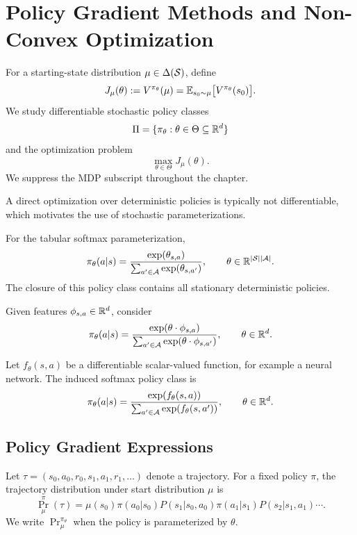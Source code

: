 \chapter{Policy Gradient Methods and Non-Convex Optimization}

For a starting-state distribution $\mu \in \Delta(\mathcal{S})$, define
\[
J_\mu(\theta) := V^{\pi_\theta}(\mu)
= \mathbb{E}_{s_0\sim \mu}\big[V^{\pi_\theta}(s_0)\big].
\]
We study differentiable stochastic policy classes
\[
\Pi=\{\pi_\theta:\theta\in\Theta\subseteq \mathbb{R}^d\}
\]
and the optimization problem
\[
\max_{\theta\in\Theta} J_\mu(\theta).
\]
We suppress the MDP subscript throughout the chapter.

A direct optimization over deterministic policies is typically not differentiable, which
motivates the use of stochastic parameterizations.

\begin{example} \label{ex:softmax}
For the tabular softmax parameterization,
\begin{equation}\label{eq:softmax}
\pi_\theta(a|s)
=
\frac{\exp(\theta_{s,a})}{\sum_{a'\in\mathcal{A}}\exp(\theta_{s,a'})},
\qquad
\theta\in \mathbb{R}^{|\mathcal{S}||\mathcal{A}|}.
\end{equation}
The closure of this policy class contains all stationary deterministic policies.
\end{example}

\begin{example} \label{ex:linear_policy}
Given features $\phi_{s,a}\in\mathbb{R}^d$, consider
\[
\pi_\theta(a|s)
=
\frac{\exp(\theta\cdot \phi_{s,a})}
{\sum_{a'\in\mathcal{A}}\exp(\theta\cdot \phi_{s,a'})},
\qquad
\theta\in\mathbb{R}^d.
\]
\end{example}

\begin{example} \label{ex:neural_policy}
Let $f_\theta(s,a)$ be a differentiable scalar-valued function, for example a neural network.
The induced softmax policy class is
\[
\pi_\theta(a|s)
=
\frac{\exp(f_\theta(s,a))}
{\sum_{a'\in\mathcal{A}}\exp(f_\theta(s,a'))},
\qquad
\theta\in\mathbb{R}^d.
\]
\end{example}

\section{Policy Gradient Expressions}

Let $\tau=(s_0,a_0,r_0,s_1,a_1,r_1,\ldots)$ denote a trajectory.
For a fixed policy $\pi$, the trajectory distribution under start distribution $\mu$ is
\begin{equation}\label{eq:prob_traj}
{\Pr}_\mu^\pi(\tau)
=
\mu(s_0)\pi(a_0|s_0)P(s_1|s_0,a_0)\pi(a_1|s_1)P(s_2|s_1,a_1)\cdots .
\end{equation}
We write ${\Pr}^{\pi_\theta}_\mu$ when the policy is parameterized by $\theta$.

